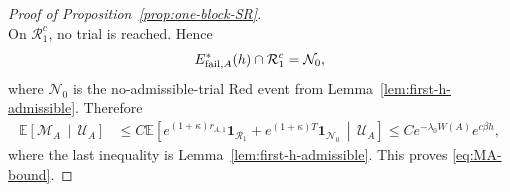 \documentclass[letterpaper,11pt,reqno]{amsart}
\theoremstyle{definition}
\begin{document}
\begin{proof}[Proof of Proposition~\ref{prop:one-block-SR}]
\[\]
On \(\mathcal R_1^c\), no trial is reached. Hence
\[
        E_{{\rm fail},A}^*(h)\cap\mathcal R_1^c
        =
        \mathcal N_0,
\]
where \(\mathcal N_0\) is the no-admissible-trial Red event from
Lemma~\ref{lem:first-h-admissible}. Therefore
\[
\begin{aligned}
        \mathbb E\left[
            \mathcal M_A
            \,\middle|\,
            \mathcal U_A
        \right]
        &\le
        C
        \mathbb E\left[
            e^{(1+\kappa)r_{A,1}}
            \mathbf 1_{\mathcal R_1}
            +
            e^{(1+\kappa) T}\mathbf 1_{\mathcal N_0}
            \,\middle|\,
            \mathcal U_A
        \right] \le
        C e^{-\lambda_0W(A)}e^{c\beta h},
\end{aligned}
\]
where the last inequality is Lemma~\ref{lem:first-h-admissible}. This proves
\eqref{eq:MA-bound}.








\end{proof}
\end{document}
